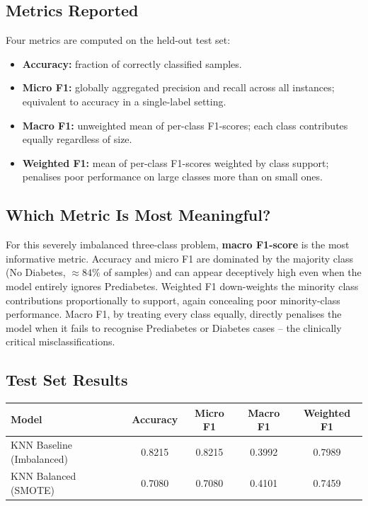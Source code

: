 \documentclass[12pt,a4paper]{article}
\begin{document}
\subsection{Metrics Reported}

Four metrics are computed on the held-out test set:

\begin{itemize}
  \item \textbf{Accuracy:} fraction of correctly classified samples.
  \item \textbf{Micro F1:} globally aggregated precision and recall across all
        instances; equivalent to accuracy in a single-label setting.
  \item \textbf{Macro F1:} unweighted mean of per-class F1-scores; each class
        contributes equally regardless of size.
  \item \textbf{Weighted F1:} mean of per-class F1-scores weighted by class support;
        penalises poor performance on large classes more than on small ones.
\end{itemize}

\subsection{Which Metric Is Most Meaningful?}
\label{sec:metric}

For this severely imbalanced three-class problem, \textbf{macro F1-score} is the
most informative metric.  Accuracy and micro F1 are dominated by the majority class
(No Diabetes, $\approx 84\%$ of samples) and can appear deceptively high even when
the model entirely ignores Prediabetes.  Weighted F1 down-weights the minority
class contributions proportionally to support, again concealing poor minority-class
performance.  Macro F1, by treating every class equally, directly penalises the
model when it fails to recognise Prediabetes or Diabetes cases -- the clinically
critical misclassifications.

\subsection{Test Set Results}

\begin{center}
\begin{tabular}{lcccc}
  \toprule
  \textbf{Model} & \textbf{Accuracy} & \textbf{Micro F1}
                 & \textbf{Macro F1} & \textbf{Weighted F1} \\
  \midrule
  KNN Baseline (Imbalanced) & 0.8215 & 0.8215 & 0.3992 & 0.7989 \\
  KNN Balanced (SMOTE)      & 0.7080 & 0.7080 & 0.4101 & 0.7459 \\
  \bottomrule
\end{tabular}
\end{center}
\end{document}
